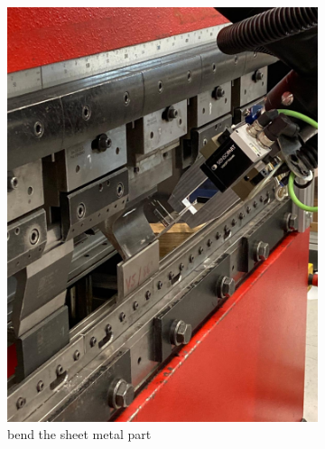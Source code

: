\begin{figure}[h]
\begin{subfigure}[b]{0.32\textwidth}
        \includegraphics[width=\textwidth]{figures/bending/bending5-002.png}
        \caption{bend the sheet metal part}
        \label{subfig:bending5}
    \end{subfigure}\hspace{0.1cm}
    \begin{subfigure}[b]{0.32\textwidth}
        \centering

\end{subfigure}
\end{figure}
